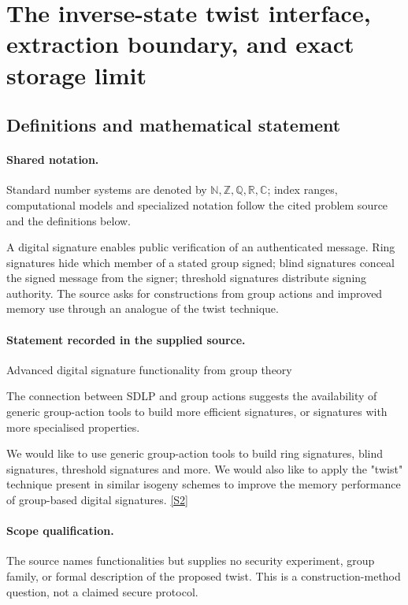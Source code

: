 \documentclass[11pt]{article}
\newcommand{\sref}[2]{\hyperlink{source:#1:#2}{[S#2]}}
\begin{document}
\section{The inverse-state twist interface, extraction boundary, and exact storage limit}\label{statement}

\subsection{Definitions and mathematical statement}

\paragraph{Shared notation.}Standard number systems are denoted by $\mathbb N,\mathbb Z,\mathbb Q,\mathbb R,\mathbb C$; index ranges, computational models and specialized notation follow the cited problem source and the definitions below.


A digital signature enables public verification of an authenticated message. Ring signatures hide which member of a stated group signed; blind signatures conceal the signed message from the signer; threshold signatures distribute signing authority. The source asks for constructions from group actions and improved memory use through an analogue of the twist technique.
\paragraph{Statement recorded in the supplied source.}
Advanced digital signature functionality from group theory

The connection between SDLP and group actions suggests the availability of generic group-action tools to build more efficient signatures, or signatures with more specialised properties.

We would like to use generic group-action tools to build ring signatures, blind signatures, threshold signatures and more. We would also like to apply the "twist" technique present in similar isogeny schemes to improve the memory performance of group-based digital signatures. \sref{statement}{2}
\paragraph{Scope qualification.}
The source names functionalities but supplies no security experiment, group family, or formal description of the proposed twist. This is a construction-method question, not a claimed secure protocol.
\end{document}
